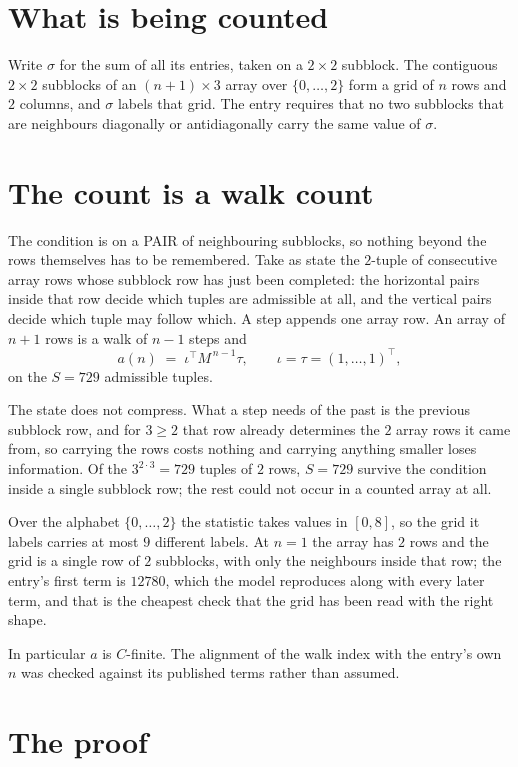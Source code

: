 \documentclass[11pt,a4paper]{article}
\theoremstyle{plain}
\theoremstyle{definition}
\begin{document}
\section{What is being counted}

Write $\sigma$ for the sum of all its entries, taken on a $2\times2$ subblock. The contiguous $2\times2$
subblocks of an $(n+1)\times3$ array over $\{0,\dots,2\}$ form a grid of $n$ rows
and $2$ columns, and $\sigma$ labels that grid. The entry
requires that no two subblocks that are neighbours diagonally or antidiagonally carry the same value of $\sigma$.

\section{The count is a walk count}

The condition is on a PAIR of neighbouring subblocks, so nothing beyond the
rows themselves has to be remembered. Take as state the $2$-tuple of consecutive array rows
whose subblock row has just been completed: the horizontal pairs inside that row decide which
tuples are admissible at all, and the vertical pairs decide which tuple may follow which. A
step appends one array row. An array of $n+1$ rows is a walk of $n-1$ steps and
\[
a(n)\;=\;\iota^{\!\top}M^{\,n-1}\tau,\qquad\iota=\tau=(1,\dots,1)^{\!\top},
\]
on the $S=729$ admissible tuples.

The state does not compress. What a step needs of the past is the previous subblock row, and
for $3\ge2$ that row already determines the $2$ array rows it came from, so carrying the
rows costs nothing and carrying anything smaller loses information. Of the $3^{2\cdot
3}=729$ tuples of $2$ rows, $S=729$ survive the condition inside a single subblock row;
the rest could not occur in a counted array at all.

Over the alphabet $\{0,\dots,2\}$ the statistic takes values in $[0,8]$, so the
grid it labels carries at most $9$ different labels. At $n=1$ the array has $2$
rows and the grid is a single row of $2$
subblocks, with only the neighbours inside that row; the entry's first term is
$12780$, which the model reproduces along with every later term, and that is the cheapest
check that the grid has been read with the right shape.

In particular $a$ is $C$-finite. The alignment of the walk index with the entry's own $n$ was
checked against its published terms rather than assumed.

\section{The proof}
\end{document}
